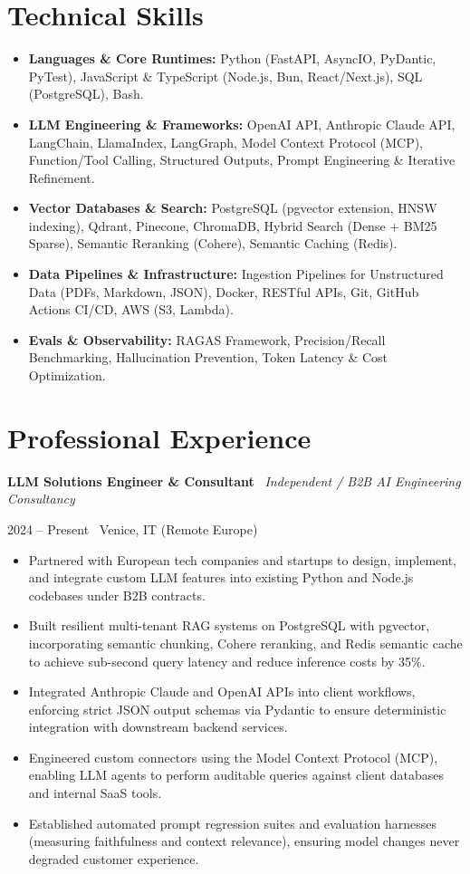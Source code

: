 \documentclass[a4paper,10pt]{article}
\newcommand{\role}[4]{%
  \vspace{2pt}\noindent
  \begin{minipage}[t]{0.70\textwidth}\raggedright\textbf{#1} \textbullet\ \textit{#3}\end{minipage}%
  \hfill
  \begin{minipage}[t]{0.28\textwidth}\raggedleft\footnotesize\color{gray}#2 \textbullet\ #4\end{minipage}%
  \vspace{1pt}%
}
\begin{document}
\section{Technical Skills}
\begin{itemize}[leftmargin=1.2em, itemsep=2pt]
  \item \textbf{Languages \& Core Runtimes:} Python (FastAPI, AsyncIO, PyDantic, PyTest), JavaScript \& TypeScript (Node.js, Bun, React/Next.js), SQL (PostgreSQL), Bash.
  \item \textbf{LLM Engineering \& Frameworks:} OpenAI API, Anthropic Claude API, LangChain, LlamaIndex, LangGraph, Model Context Protocol (MCP), Function/Tool Calling, Structured Outputs, Prompt Engineering \& Iterative Refinement.
  \item \textbf{Vector Databases \& Search:} PostgreSQL (pgvector extension, HNSW indexing), Qdrant, Pinecone, ChromaDB, Hybrid Search (Dense + BM25 Sparse), Semantic Reranking (Cohere), Semantic Caching (Redis).
  \item \textbf{Data Pipelines \& Infrastructure:} Ingestion Pipelines for Unstructured Data (PDFs, Markdown, JSON), Docker, RESTful APIs, Git, GitHub Actions CI/CD, AWS (S3, Lambda).
  \item \textbf{Evals \& Observability:} RAGAS Framework, Precision/Recall Benchmarking, Hallucination Prevention, Token Latency \& Cost Optimization.
\end{itemize}

\section{Professional Experience}

\role{LLM Solutions Engineer \& Consultant}{2024 -- Present}{Independent / B2B AI Engineering Consultancy}{Venice, IT (Remote Europe)}
\begin{itemize}
  \item Partnered with European tech companies and startups to design, implement, and integrate custom LLM features into existing Python and Node.js codebases under B2B contracts.
  \item Built resilient multi-tenant RAG systems on PostgreSQL with pgvector, incorporating semantic chunking, Cohere reranking, and Redis semantic cache to achieve sub-second query latency and reduce inference costs by 35\%.
  \item Integrated Anthropic Claude and OpenAI APIs into client workflows, enforcing strict JSON output schemas via Pydantic to ensure deterministic integration with downstream backend services.
  \item Engineered custom connectors using the Model Context Protocol (MCP), enabling LLM agents to perform auditable queries against client databases and internal SaaS tools.
  \item Established automated prompt regression suites and evaluation harnesses (measuring faithfulness and context relevance), ensuring model changes never degraded customer experience.
\end{itemize}
\end{document}
